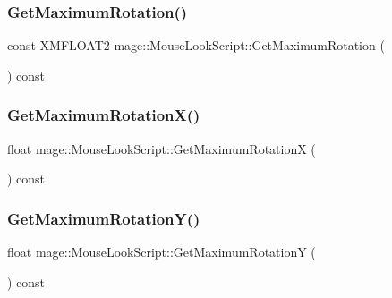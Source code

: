 \subsubsection{\texorpdfstring{Get\+Maximum\+Rotation()}{GetMaximumRotation()}}
{\footnotesize\ttfamily const X\+M\+F\+L\+O\+A\+T2 mage\+::\+Mouse\+Look\+Script\+::\+Get\+Maximum\+Rotation (\begin{DoxyParamCaption}{ }\end{DoxyParamCaption}) const}

\hypertarget{classmage_1_1_mouse_look_script_a07b026b6cb84edfacba8c05dc550da80}{}\label{classmage_1_1_mouse_look_script_a07b026b6cb84edfacba8c05dc550da80} 
\subsubsection{\texorpdfstring{Get\+Maximum\+Rotation\+X()}{GetMaximumRotationX()}}
{\footnotesize\ttfamily float mage\+::\+Mouse\+Look\+Script\+::\+Get\+Maximum\+RotationX (\begin{DoxyParamCaption}{ }\end{DoxyParamCaption}) const}

\hypertarget{classmage_1_1_mouse_look_script_a9d7ac7941846f4c47d65718faabf6dad}{}\label{classmage_1_1_mouse_look_script_a9d7ac7941846f4c47d65718faabf6dad} 
\subsubsection{\texorpdfstring{Get\+Maximum\+Rotation\+Y()}{GetMaximumRotationY()}}
{\footnotesize\ttfamily float mage\+::\+Mouse\+Look\+Script\+::\+Get\+Maximum\+RotationY (\begin{DoxyParamCaption}{ }\end{DoxyParamCaption}) const}

\hypertarget{classmage_1_1_mouse_look_script_aa0ee621d5f42580f45a324ce856f2c82}{}\label{classmage_1_1_mouse_look_script_aa0ee621d5f42580f45a324ce856f2c82} 
